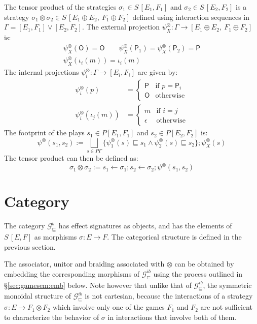 \documentclass[11pt,oneside]{book}
\theoremstyle{definition}
\newcommand{\gcat}{\mathcal{G}_{\sqsubseteq}}
\newcommand{\kw}[1]{\ensuremath{ \mathsf{#1} }}
\begin{document}
The tensor product of the strategies
$\sigma_1 \in S\,[E_1,F_1]$ and
$\sigma_2 \in S\,[E_2,F_2]$
is a strategy
$\sigma_1 \otimes \sigma_2 \in S\,[E_1 \oplus E_2, \: F_1 \oplus F_2]$
defined using interaction sequences in
$\Gamma = [E_1,F_1] \vee [E_2,F_2]$.
The external projection
$\psi^\otimes_X : \Gamma \rightarrow [E_1 \oplus E_2, \: F_1 \oplus F_2]$
is:
\begin{gather*}
  \psi^\otimes_X(\kw{O}) = \kw{O} \qquad
  \psi^\otimes_X(\kw{P}_1) = \psi^\otimes_X(\kw{P}_2) = \kw{P} \\
  \psi^\otimes_X(\iota_i(m)) = \iota_i(m)
\end{gather*}
The internal projections
$\psi^\otimes_i : \Gamma \rightarrow [E_i, F_i]$
are given by:
\begin{align*}
  \psi^\otimes_i(p) &= \begin{cases}
    \kw{P} & \text{if } p = \kw{P}_i \\
    \kw{O} & \text{otherwise}
  \end{cases} \\
  \psi^\otimes_i(\iota_j(m)) &= \begin{cases}
    m & \text{if } i = j \\
    \epsilon & \text{otherwise}
  \end{cases}
\end{align*}
The footprint of the plays
$s_1 \in P [E_1,F_1]$ and $s_2 \in P [E_2, F_2]$
is:
\[
  \psi^\otimes(s_1, s_2) :=
  \bigsqcup_{s \in P \Gamma}
  \{ \psi^\otimes_1(s) \sqsubseteq s_1 \wedge
     \psi^\otimes_2(s) \sqsubseteq s_2 \} ;
  \psi^\otimes_X(s)
\]
The tensor product can then be defined as:
\[
  \sigma_1 \otimes \sigma_2 :=
  s_1 \leftarrow \sigma_1 ;
  s_2 \leftarrow \sigma_2 ;
  \psi^\otimes(s_1, s_2)
\]



\section{Category} \label{sec:gamesem:cat} %

The category $\gcat^b$
has effect signatures as objects,
and has the elements of $S \, [E,F]$
as morphisms $\sigma : E \rightarrow F$.
The categorical structure is
defined in the previous section.

The associator, unitor and braiding
associated with $\otimes$
can be obtained by embedding
the corresponding morphisms of $\gcat^{ib}$
using the process outlined in \S\ref{sec:gamesem:emb} below.
Note however that unlike that of $\gcat^{ib}$,
the symmetric monoidal structure of $\gcat^{ib}$
is not cartesian,
because the interactions of a strategy
$\sigma : E \rightarrow F_1 \otimes F_2$
which involve only one of the games $F_1$ and $F_2$
are not sufficient to characterize the behavior of $\sigma$
in interactions that involve both of them.
\end{document}
